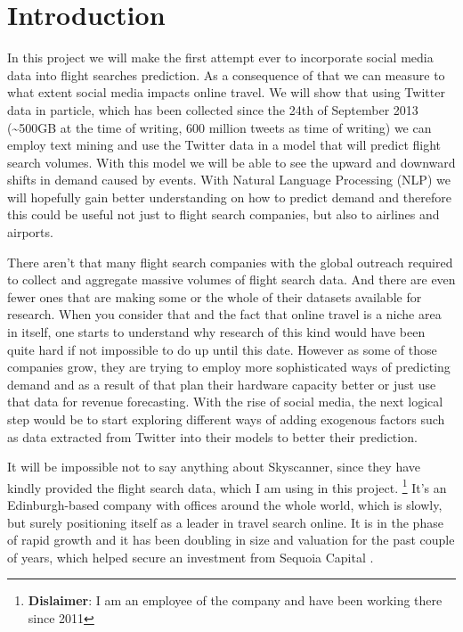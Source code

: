 \documentclass[minf,twoside,singlespacing,parskip,frontabs]{infthesis}
\begin{document}
\section{Introduction}

In this project we will make the first attempt ever to incorporate social media data into flight searches prediction. As a consequence of that we can measure to what extent social media impacts online travel. We will show that using Twitter data in particle, which has been collected since the 24th of September 2013 (\textasciitilde 500GB at the time of writing, 600 million tweets as time of writing) we can employ text mining and use the Twitter data in a model that will predict flight search volumes. With this model we will be able to see the upward and downward shifts in demand caused by events. With Natural Language Processing (NLP) we will hopefully gain better understanding on how to predict demand and therefore this could be useful not just to flight search companies, but also to airlines and airports. 


There aren't that many flight search companies with the global outreach required to collect and aggregate massive volumes of flight search data. And there are even fewer ones that are making some or the whole of their datasets available for research. When you consider that and the fact that online travel is a niche area in itself, one starts to understand why research of this kind would have been quite hard if not impossible to do up until this date. However as some of those companies grow, they are trying to employ more sophisticated ways of predicting demand and as a result of that plan their hardware capacity better or just use that data for revenue forecasting. With the rise of social media, the next logical step would be to start exploring different ways of adding exogenous factors such as data extracted from Twitter into their models to better their prediction. 


It will be impossible not to say anything about Skyscanner, since they have kindly provided the flight search data, which I am using in this project. \footnote{\textbf{Dislaimer}: I am an employee of the company and have been working there since 2011} It's an Edinburgh-based company with offices around the whole world, which is slowly, but surely positioning itself as a leader in travel search online. It is in the phase of rapid growth and it has been doubling in size and valuation for the past couple of years, which helped secure an investment from Sequoia Capital \cite{seqcap}.  
\end{document}
